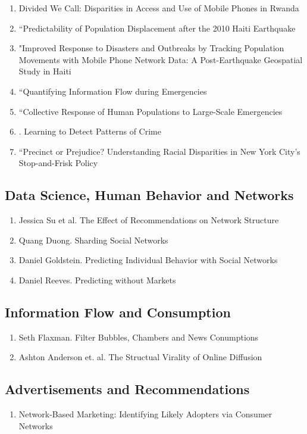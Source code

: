 \begin{enumerate}
\item Divided We Call: Disparities in Access and Use of Mobile Phones in Rwanda
\item “Predictability of Population Displacement after the 2010 Haiti Earthquake
\item "Improved Response to Disasters and Outbreaks by Tracking Population Movements with Mobile Phone Network Data: A Post-Earthquake Geospatial Study in Haiti
\item “Quantifying Information Flow during Emergencies
\item “Collective Response of Human Populations to Large-Scale Emergencies
\item . Learning to Detect Patterns of Crime
\item “Precinct or Prejudice? Understanding Racial Disparities in New York City’s Stop-and-Frisk Policy
\end{enumerate}

\subsection{Data Science, Human Behavior and Networks}
\begin{enumerate}
\item Jessica Su et al. The Effect of Recommendations on Network Structure
\item Quang Duong. Sharding Social Networks
\item Daniel Goldstein. Predicting Individual Behavior with Social Networks
\item Daniel Reeves. Predicting without Markets
\end{enumerate}


\subsection{Information Flow and Consumption}
\begin{enumerate}
\item Seth Flaxman. Filter Bubbles, Chambers and News Conumptions
\item Ashton Anderson et. al. The Structual Virality of Online Diffusion
\end{enumerate}

\subsection{Advertisements and Recommendations}
\begin{enumerate}
\item Network-Based Marketing: Identifying Likely Adopters via Consumer Networks
\end{enumerate}